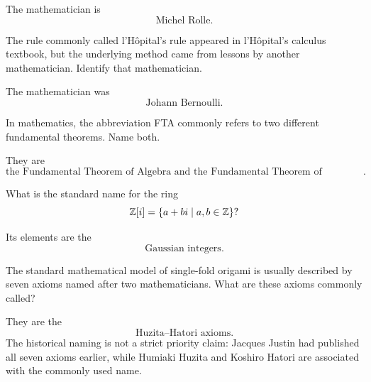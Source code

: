     \begin{solution}
        The mathematician is
        \[
            \boxed{\text{Michel Rolle}}.
        \]
    \end{solution}

    \begin{expectedproblem}
        The rule commonly called l'H\^opital's rule appeared in
        l'H\^opital's calculus textbook, but the underlying method came from
        lessons by another mathematician. Identify that mathematician.
    \end{expectedproblem}

    \begin{solution}
        The mathematician was
        \[
            \boxed{\text{Johann Bernoulli}}.
        \]
    \end{solution}

    \begin{expectedproblem}
        In mathematics, the abbreviation FTA commonly refers to two different
        fundamental theorems. Name both.
    \end{expectedproblem}

    \begin{solution}
        They are
        \[
            \boxed{
                \text{the Fundamental Theorem of Algebra and the Fundamental
                Theorem of Arithmetic}
            }.
        \]
    \end{solution}

    \begin{expectedproblem}
        What is the standard name for the ring
        \[
            \mathbb{Z}[i]=\{a+bi\mid a,b\in\mathbb{Z}\}?
        \]
    \end{expectedproblem}

    \begin{solution}
        Its elements are the
        \[
            \boxed{\text{Gaussian integers}}.
        \]
    \end{solution}

    \begin{expectedproblem}
        The standard mathematical model of single-fold origami is usually
        described by seven axioms named after two mathematicians. What are
        these axioms commonly called?
    \end{expectedproblem}

    \begin{solution}
        They are the
        \[
            \boxed{\text{Huzita--Hatori axioms}}.
        \]
        The historical naming is not a strict priority claim: Jacques Justin
        had published all seven axioms earlier, while Humiaki Huzita and
        Koshiro Hatori are associated with the commonly used name.
    \end{solution}

